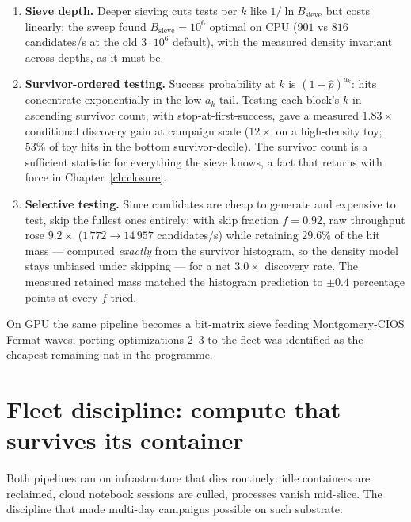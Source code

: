 \begin{enumerate}
\item \textbf{Sieve depth.} Deeper sieving cuts tests per $k$ like
$1/\ln B_{\mathrm{sieve}}$ but costs linearly; the sweep found
$B_{\mathrm{sieve}}=10^6$ optimal on CPU ($901$ vs $816$ candidates/s
at the old $3\cdot10^6$ default), with the measured density invariant
across depths, as it must be.
\item \textbf{Survivor-ordered testing.} Success probability at $k$ is
$(1-\hat p)^{a_k}$: hits concentrate exponentially in the low-$a_k$
tail. Testing each block's $k$ in ascending survivor count, with
stop-at-first-success, gave a measured $1.83\times$ conditional
discovery gain at campaign scale ($12\times$ on a high-density toy;
$53\%$ of toy hits in the bottom survivor-decile). The survivor count
is a sufficient statistic for everything the sieve knows, a fact that
returns with force in Chapter~\ref{ch:closure}.
\item \textbf{Selective testing.} Since candidates are cheap to
generate and expensive to test, skip the fullest ones entirely: with
skip fraction $f=0.92$, raw throughput rose $9.2\times$
($1\,772\to14\,957$ candidates/s) while retaining $29.6\%$ of the hit
mass --- computed \emph{exactly} from the survivor histogram, so the
density model stays unbiased under skipping --- for a net $3.0\times$
discovery rate. The measured retained mass matched the histogram
prediction to $\pm0.4$ percentage points at every $f$ tried.
\end{enumerate}

On GPU the same pipeline becomes a bit-matrix sieve feeding
Montgomery-CIOS Fermat waves; porting optimizations 2--3 to the fleet
was identified as the cheapest remaining nat in the programme.

\section{Fleet discipline: compute that survives its container}\label{sec:fleet}

Both pipelines ran on infrastructure that dies routinely: idle
containers are reclaimed, cloud notebook sessions are culled, processes
vanish mid-slice. The discipline that made multi-day campaigns possible
on such substrate:

